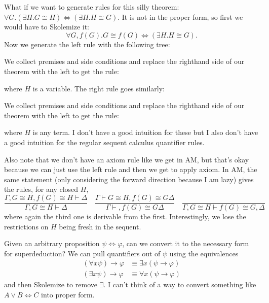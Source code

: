 \documentclass[12pt]{article}
\begin{document}
What if we want to generate rules for this silly theorem: $\forall G.(\exists
H.G\cong H)\Leftrightarrow(\exists H.H\cong G)$. It is not in the proper form,
so first we would have to Skolemize it:
\[
    \forall G,f(G).G\cong f(G)\Leftrightarrow(\exists H.H\cong G).
\]
Now we generate the left rule with the following tree:
\begin{prooftree}
\end{prooftree}
We collect premises and side conditions and replace the righthand side of our
theorem with the left to get the rule:
\begin{prooftree}
\end{prooftree}
where $H$ is a variable.
The right rule goes similarly:
\begin{prooftree}
\end{prooftree}
We collect premises and side conditions and replace the righthand side of our
theorem with the left to get the rule:
\begin{prooftree}
\end{prooftree}
where $H$ is any term.
I don't have a good intuition for these but I also don't have a good intuition
for the regular sequent calculus quantifier rules.

Also note that we don't have an axiom rule like we get in AM, but that's okay
because we can just use the left rule and then we get to apply axiom. In AM, the
same statement (only considering the forward direction because I am lazy) gives
the rules, for any closed $H$,
\[
    \frac{\Gamma,G\cong H,f(G)\cong H\vdash\Delta}{\Gamma,G\cong H\vdash\Delta}
    \quad
    \frac{\Gamma\vdash G\cong H,f(G)\cong G\Delta}{\Gamma\vdash,f(G)\cong G\Delta}
    \quad
    \frac{}{\Gamma,G\cong H\vdash f(G)\cong G,\Delta}
\]
where again the third one is derivable from the first. Interestingly, we lose
the restrictions on $H$ being fresh in the sequent.

Given an arbitrary proposition $\psi\Leftrightarrow\varphi$, can we convert it
to the necessary form for superdeduction? We can pull quantifiers out of $\psi$
using the equivalences
\begin{align*}
    (\forall x\psi)\rightarrow\varphi &\equiv \exists x(\psi\rightarrow\varphi) \\
    (\exists x\psi)\rightarrow\varphi &\equiv \forall x(\psi\rightarrow\varphi)
\end{align*}
and then Skolemize to remove $\exists$. I can't think of a way to convert
something like $A\vee B\Leftrightarrow C$ into proper form.
\end{document}
